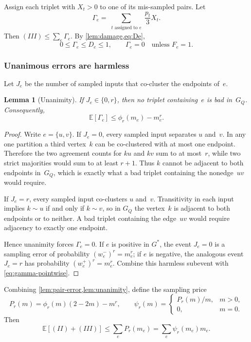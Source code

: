 \documentclass[11pt,letterpaper]{article}
\newtheorem{lemma}[theorem]{Lemma}
\theoremstyle{definition}
\theoremstyle{remark}
\newcommand{\E}{\mathbb{E}}
\newcommand{\1}{\mathbf{1}}
\begin{document}
Assign each triplet with $X_t>0$ to one of its mis-sampled pairs.  Let
\[
 \Gamma_e=\sum_{\substack{t\text{ assigned to }e}}
 \frac{p_t}{3}X_t.
\]
Then $(III)\le\sum_e\Gamma_e$.  By \cref{lem:damage,eq:De},
\begin{equation}\label{eq:gamma-pointwise}
 0\le\Gamma_e\le D_e\le1,
 \qquad
 \Gamma_e=0\quad\text{unless }F_e=1.
\end{equation}

\subsubsection{Unanimous errors are harmless}

Let $J_e$ be the number of sampled inputs that co-cluster the endpoints of~$e$.

\begin{lemma}[Unanimity]\label{lem:unanimity}
If $J_e\in\{0,r\}$, then no triplet containing~$e$ is bad in~$G_Q$.  Consequently,
\[
 \E[\Gamma_e]\le \phi_r(m_e)-m_e^r.
\]
\end{lemma}

\begin{proof}
Write $e=\{u,v\}$.  If $J_e=0$, every sampled input separates $u$ and~$v$.  In any one partition a third vertex~$k$ can be co-clustered with at most one endpoint.  Therefore the two agreement counts for $ku$ and $kv$ sum to at most~$r$, while two strict majorities would sum to at least $r+1$.  Thus $k$ cannot be adjacent to both endpoints in~$G_Q$, which is exactly what a bad triplet containing the nonedge~$uv$ would require.

If $J_e=r$, every sampled input co-clusters $u$ and~$v$.  Transitivity in each input implies $k\sim u$ if and only if $k\sim v$, so in $G_Q$ the vertex~$k$ is adjacent to both endpoints or to neither.  A bad triplet containing the edge~$uv$ would require adjacency to exactly one endpoint.

Hence unanimity forces $\Gamma_e=0$.  If $e$ is positive in $G^*$, the event $J_e=0$ is a sampling error of probability $(w_e^-)^r=m_e^r$; if $e$ is negative, the analogous event $J_e=r$ has probability $(w_e^+)^r=m_e^r$.  Combine this harmless subevent with \cref{eq:gamma-pointwise}.
\end{proof}

Combining \cref{lem:pair-error,lem:unanimity}, define the sampling price
\begin{equation}\label{eq:price}
 P_r(m)=\phi_r(m)(2-2m)-m^r,
 \qquad
 \psi_r(m)=
 \begin{cases}
 P_r(m)/m,&m>0,\\
 0,&m=0.
 \end{cases}
\end{equation}
Then
\begin{equation}\label{eq:sampling-price}
 \E[(II)+(III)]\le\sum_eP_r(m_e)
 =\sum_e\psi_r(m_e)m_e.
\end{equation}
\end{document}

